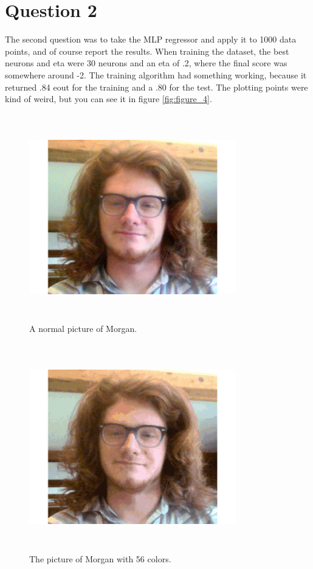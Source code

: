 \documentclass[a4paper]{article}
\begin{document}
\section{Question 2}
The second question was to take the MLP regressor and apply it to 1000 data points, and of course report the results. When training the dataset, the best neurons and eta were 30 neurons and an eta of .2, where the final score was somewhere around -2. The training algorithm had something working, because it returned .84 eout for the training and a .80 for the test. The plotting points were kind of weird, but you can see it in figure \ref{fig:figure_4}.
\begin{figure}
  \includegraphics[width=9cm, height=9cm]{normalpic.png}
  \caption{A normal picture of Morgan.}
  \label{fig:figure_3}
\end{figure}
\begin{figure}
  \includegraphics[width=9cm,height=9cm]{n=56.png}
  \caption{The picture of Morgan with 56 colors.}
  \label{fig:figure_1}
\end{figure}
\end{document}
